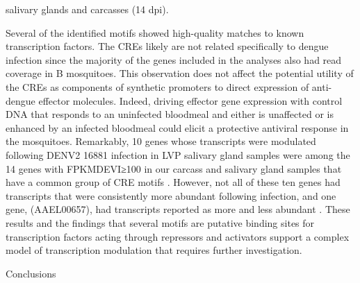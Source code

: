 salivary glands and carcasses (14 dpi).

Several of the identified motifs showed high-quality matches to known transcription factors.
The CREs likely are not related specifically to dengue infection since the majority of the genes included in the analyses also had read coverage in B mosquitoes.
This observation does not affect the potential utility of the CREs as components of synthetic promoters to direct expression of anti-dengue effector molecules.
Indeed, driving effector gene expression with control DNA that responds to an uninfected bloodmeal and either is unaffected or is enhanced by an infected bloodmeal could elicit a protective antiviral response in the mosquitoes.
Remarkably, 10 genes whose transcripts were modulated following DENV2 16881 infection in LVP salivary gland samples were among the 14 genes with FPKMDEVI≥100 in our carcass and salivary gland samples that have a common group of CRE motifs \cite{Luplertlop2011}.
However, not all of these ten genes had transcripts that were consistently more abundant following infection, and one gene, (AAEL00657), had transcripts reported as more and less abundant \cite{Luplertlop2011}.
These results and the findings that several motifs are putative binding sites for transcription factors acting through repressors and activators support a complex model of transcription modulation that requires further investigation.

Conclusions

